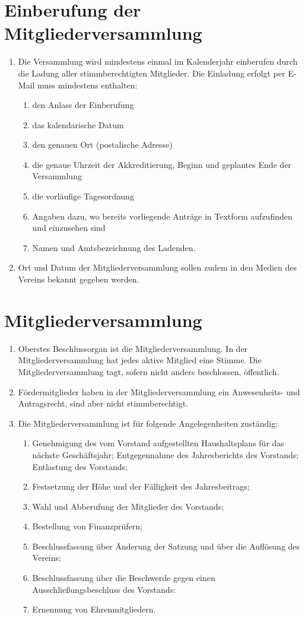 \chapter{Einberufung der Mitgliederversammlung}
\begin{enumerate}
	\item  Die Versammlung wird mindestens einmal im Kalenderjahr einberufen durch die Ladung aller stimmberechtigten Mitglieder. Die Einladung erfolgt per E-Mail muss mindestens enthalten:
		\begin{enumerate}[1)]
			\item den Anlass der Einberufung
			\item das kalendarische Datum
			\item den genauen Ort (postalische Adresse)
			\item die genaue Uhrzeit der Akkreditierung, Beginn und geplantes Ende der Versammlung
			\item die vorläufige Tagesordnung
			\item Angaben dazu, wo bereits vorliegende Anträge in Textform aufzufinden und einzusehen sind
			\item Namen und Amtsbezeichnung des Ladenden.
		\end{enumerate}
	\item Ort und Datum der Mitgliederversammlung sollen zudem in den Medien des Vereins bekannt gegeben werden.
\end{enumerate}

\chapter{Mitgliederversammlung}
\begin{enumerate}
	\item Oberstes Beschlussorgan ist die Mitgliederversammlung. In der Mitgliederversammlung hat jedes aktive Mitglied eine Stimme. Die Mitgliederversammlung tagt, sofern nicht anders beschlossen, öffentlich.
	\item Fördermitglieder haben in der Mitgliederversammlung ein Anwesenheits- und Antragsrecht, sind aber nicht stimmberechtigt.
	\item Die Mitgliederversammlung ist für folgende Angelegenheiten zuständig:
		\begin{enumerate}[1)]
			\item Genehmigung des vom Vorstand aufgestellten Haushaltsplans für das nächste Geschäftsjahr; Entgegennahme des Jahresberichts des Vorstands; Entlastung des Vorstands;
			\item Festsetzung der Höhe und der Fälligkeit des Jahresbeitrags;
			\item Wahl und Abberufung der Mitglieder des Vorstands;
			\item Bestellung von Finanzprüfern;
			\item Beschlussfassung über Änderung der Satzung und über die Auflösung des Vereins;
			\item Beschlussfassung über die Beschwerde gegen einen Ausschließungsbeschluss des Vorstands:
			\item Ernennung von Ehrenmitgliedern.
		\end{enumerate}
\end{enumerate}


